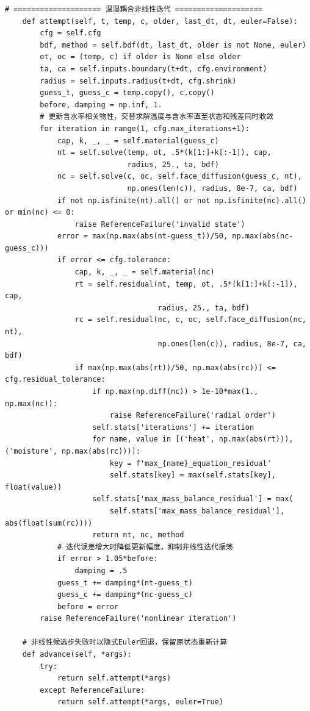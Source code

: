 \begin{Verbatim}[fontsize=\scriptsize,breaklines=true,breakanywhere=true]
    # ==================== 温湿耦合非线性迭代 ====================
    def attempt(self, t, temp, c, older, last_dt, dt, euler=False):
        cfg = self.cfg
        bdf, method = self.bdf(dt, last_dt, older is not None, euler)
        ot, oc = (temp, c) if older is None else older
        ta, ca = self.inputs.boundary(t+dt, cfg.environment)
        radius = self.inputs.radius(t+dt, cfg.shrink)
        guess_t, guess_c = temp.copy(), c.copy()
        before, damping = np.inf, 1.
        # 更新含水率相关物性，交替求解温度与含水率直至状态和残差同时收敛
        for iteration in range(1, cfg.max_iterations+1):
            cap, k, _, _ = self.material(guess_c)
            nt = self.solve(temp, ot, .5*(k[1:]+k[:-1]), cap,
                            radius, 25., ta, bdf)
            nc = self.solve(c, oc, self.face_diffusion(guess_c, nt),
                            np.ones(len(c)), radius, 8e-7, ca, bdf)
            if not np.isfinite(nt).all() or not np.isfinite(nc).all() or min(nc) <= 0:
                raise ReferenceFailure('invalid state')
            error = max(np.max(abs(nt-guess_t))/50, np.max(abs(nc-guess_c)))
            if error <= cfg.tolerance:
                cap, k, _, _ = self.material(nc)
                rt = self.residual(nt, temp, ot, .5*(k[1:]+k[:-1]), cap,
                                   radius, 25., ta, bdf)
                rc = self.residual(nc, c, oc, self.face_diffusion(nc, nt),
                                   np.ones(len(c)), radius, 8e-7, ca, bdf)
                if max(np.max(abs(rt))/50, np.max(abs(rc))) <= cfg.residual_tolerance:
                    if np.max(np.diff(nc)) > 1e-10*max(1., np.max(nc)):
                        raise ReferenceFailure('radial order')
                    self.stats['iterations'] += iteration
                    for name, value in [('heat', np.max(abs(rt))), ('moisture', np.max(abs(rc)))]:
                        key = f'max_{name}_equation_residual'
                        self.stats[key] = max(self.stats[key], float(value))
                    self.stats['max_mass_balance_residual'] = max(
                        self.stats['max_mass_balance_residual'], abs(float(sum(rc))))
                    return nt, nc, method
            # 迭代误差增大时降低更新幅度，抑制非线性迭代振荡
            if error > 1.05*before:
                damping = .5
            guess_t += damping*(nt-guess_t)
            guess_c += damping*(nc-guess_c)
            before = error
        raise ReferenceFailure('nonlinear iteration')

    # 非线性候选步失败时以隐式Euler回退，保留原状态重新计算
    def advance(self, *args):
        try:
            return self.attempt(*args)
        except ReferenceFailure:
            return self.attempt(*args, euler=True)


\end{Verbatim}
